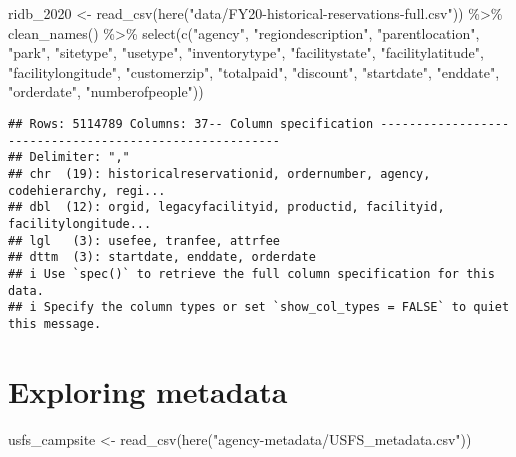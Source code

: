 \documentclass[
]{article}
\newenvironment{Shaded}{\begin{snugshade}}{\end{snugshade}}
\newcommand{\FunctionTok}[1]{\textcolor[rgb]{0.00,0.00,0.00}{#1}}
\newcommand{\NormalTok}[1]{#1}
\newcommand{\OtherTok}[1]{\textcolor[rgb]{0.56,0.35,0.01}{#1}}
\newcommand{\SpecialCharTok}[1]{\textcolor[rgb]{0.00,0.00,0.00}{#1}}
\newcommand{\StringTok}[1]{\textcolor[rgb]{0.31,0.60,0.02}{#1}}
\begin{document}
\begin{Shaded}
\begin{Highlighting}[]
\NormalTok{ridb\_2020 }\OtherTok{\textless{}{-}} \FunctionTok{read\_csv}\NormalTok{(}\FunctionTok{here}\NormalTok{(}\StringTok{"data/FY20{-}historical{-}reservations{-}full.csv"}\NormalTok{)) }\SpecialCharTok{\%\textgreater{}\%} 
  \FunctionTok{clean\_names}\NormalTok{() }\SpecialCharTok{\%\textgreater{}\%} 
  \FunctionTok{select}\NormalTok{(}\FunctionTok{c}\NormalTok{(}\StringTok{"agency"}\NormalTok{, }
           \StringTok{"regiondescription"}\NormalTok{,}
           \StringTok{"parentlocation"}\NormalTok{,}
           \StringTok{"park"}\NormalTok{,}
           \StringTok{"sitetype"}\NormalTok{,}
           \StringTok{"usetype"}\NormalTok{,}
           \StringTok{"inventorytype"}\NormalTok{,}
           \StringTok{"facilitystate"}\NormalTok{,}
           \StringTok{"facilitylatitude"}\NormalTok{,}
           \StringTok{"facilitylongitude"}\NormalTok{,}
           \StringTok{"customerzip"}\NormalTok{,}
           \StringTok{"totalpaid"}\NormalTok{,}
           \StringTok{"discount"}\NormalTok{,}
           \StringTok{"startdate"}\NormalTok{,}
           \StringTok{"enddate"}\NormalTok{,}
           \StringTok{"orderdate"}\NormalTok{,}
           \StringTok{"numberofpeople"}\NormalTok{))}
\end{Highlighting}
\end{Shaded}

\begin{verbatim}
## Rows: 5114789 Columns: 37-- Column specification --------------------------------------------------------
## Delimiter: ","
## chr  (19): historicalreservationid, ordernumber, agency, codehierarchy, regi...
## dbl  (12): orgid, legacyfacilityid, productid, facilityid, facilitylongitude...
## lgl   (3): usefee, tranfee, attrfee
## dttm  (3): startdate, enddate, orderdate
## i Use `spec()` to retrieve the full column specification for this data.
## i Specify the column types or set `show_col_types = FALSE` to quiet this message.
\end{verbatim}

\hypertarget{exploring-metadata}{%
\section{Exploring metadata}\label{exploring-metadata}}

\begin{Shaded}
\begin{Highlighting}[]
\NormalTok{usfs\_campsite }\OtherTok{\textless{}{-}} \FunctionTok{read\_csv}\NormalTok{(}\FunctionTok{here}\NormalTok{(}\StringTok{"agency{-}metadata/USFS\_metadata.csv"}\NormalTok{))}
\end{Highlighting}
\end{Shaded}
\end{document}
